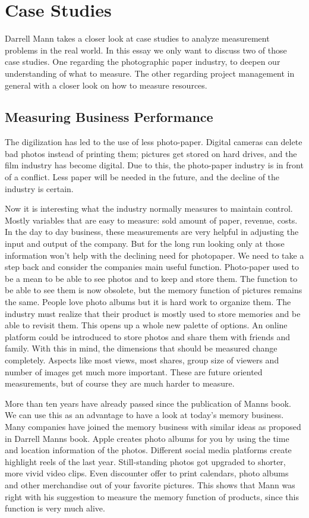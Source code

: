 \chapter{Case Studies}

Darrell Mann takes a closer look at case studies to analyze measurement problems in the real world.
In this essay we only want to discuss two of those case studies.
One regarding the photographic paper industry, to deepen our understanding of what to measure.
The other regarding project management in general with a closer look on how to measure resources.

\section{Measuring Business Performance}

The digilization has led to the use of less photo-paper.
Digital cameras can delete bad photos instead of printing them; pictures get stored on hard drives, and the film industry has become digital.
Due to this, the photo-paper industry is in front of a conflict.
Less paper will be needed in the future, and the decline of the industry is certain.

Now it is interesting what the industry normally measures to maintain control.
Mostly variables that are easy to measure: sold amount of paper, revenue, costs.
In the day to day business, these measurements are very helpful in adjusting the input and output of the company.
But for the long run looking only at those information won't help with the declining need for photopaper.
We need to take a step back and consider the companies main useful function.
Photo-paper used to be a mean to be able to see photos and to keep and store them.
The function to be able to see them is now obsolete, but the memory function of pictures remains the same.
People love photo albums but it is hard work to organize them.
The industry must realize that their product is mostly used to store memories and be able to revisit them.
This opens up a whole new palette of options.
An online platform could be introduced to store photos and share them with friends and family.
With this in mind, the dimensions that should be measured change completely.
Aspects like most views, most shares, group size of viewers and number of images get much more important.
These are future oriented measurements, but of course they are much harder to measure.

More than ten years have already passed since the publication of Manns book.
We can use this as an advantage to have a look at today's memory business.
Many companies have joined the memory business with similar ideas as proposed in Darrell Manns book.
Apple creates photo albums for you by using the time and location information of the photos.
Different social media platforms create highlight reels of the last year.
Still-standing photos got upgraded to shorter, more vivid video clips.
Even discounter offer to print calendars, photo albums and other merchandise out of your favorite pictures.
This shows that Mann was right with his suggestion to measure the memory function of products, since this function is very much alive.

